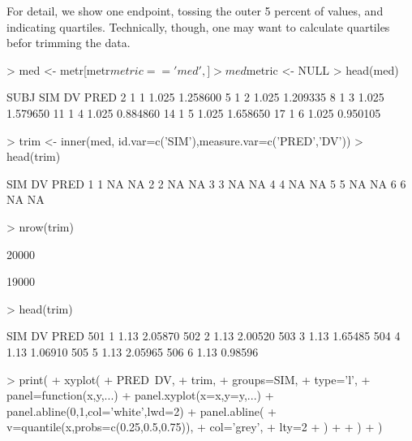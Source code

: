 For detail, we show one endpoint, tossing the outer 5 percent of values, and 
indicating quartiles. Technically, though, one may want to calculate quartiles
befor trimming the data.
\begin{Schunk}
\begin{Sinput}
> med <- metr[metr$metric=='med',]
> med$metric <- NULL
> head(med)
\end{Sinput}
\begin{Soutput}
   SUBJ SIM    DV     PRED
2     1   1 1.025 1.258600
5     1   2 1.025 1.209335
8     1   3 1.025 1.579650
11    1   4 1.025 0.884860
14    1   5 1.025 1.658650
17    1   6 1.025 0.950105
\end{Soutput}
\begin{Sinput}
> trim <- inner(med, id.var=c('SIM'),measure.var=c('PRED','DV'))
> head(trim)
\end{Sinput}
\begin{Soutput}
  SIM DV PRED
1   1 NA   NA
2   2 NA   NA
3   3 NA   NA
4   4 NA   NA
5   5 NA   NA
6   6 NA   NA
\end{Soutput}
\begin{Sinput}
> nrow(trim)
\end{Sinput}
\begin{Soutput}
[1] 20000
\end{Soutput}
\begin{Soutput}
[1] 19000
\end{Soutput}
\begin{Sinput}
> head(trim)
\end{Sinput}
\begin{Soutput}
    SIM   DV    PRED
501   1 1.13 2.05870
502   2 1.13 2.00520
503   3 1.13 1.65485
504   4 1.13 1.06910
505   5 1.13 2.05965
506   6 1.13 0.98596
\end{Soutput}
\begin{Sinput}
> print(
+ 	xyplot(
+ 		PRED~DV,
+ 		trim,
+ 		groups=SIM,
+ 		type='l',
+ 		panel=function(x,y,...){
+ 			panel.xyplot(x=x,y=y,...)
+ 			panel.abline(0,1,col='white',lwd=2)
+ 			panel.abline(
+ 				v=quantile(x,probs=c(0.25,0.5,0.75)),
+ 				col='grey',
+ 				lty=2
+ 			)
+ 		}
+ 	)
+ )
\end{Sinput}
\end{Schunk}
